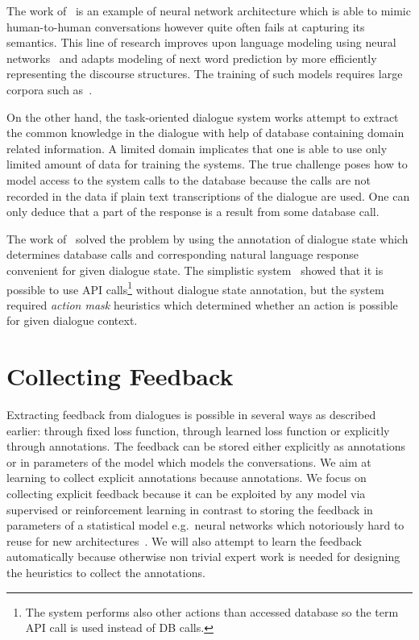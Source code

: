 \documentclass[11pt]{article}
\begin{document}
The work of~\cite{serban_multiresolution_2016} is an example of neural network architecture which is able to mimic human-to-human conversations however quite often fails at capturing its semantics.
This line of research improves upon language modeling using neural networks~\cite{mikolov_efficient_2013} and adapts modeling of next word prediction by more efficiently representing the discourse structures.
The training of such models requires large corpora such as~\cite{lowe_ubuntu_2015}. 

On the other hand, the task-oriented dialogue system works attempt to extract the common knowledge in the dialogue with help of database containing domain related information.
A limited domain implicates that one is able to use only limited amount of data for training the systems.
The true challenge poses how to model access to the system calls to the database because the calls are not recorded in the data if plain text transcriptions of the dialogue are used.
One can only deduce that a part of the response is a result from some database call.

The work of~\cite{wen_networkbased_2016} solved the problem by using the annotation of dialogue state which determines database calls and corresponding natural language response convenient for given dialogue state. 
The simplistic system~\cite{williams2016end} showed that it is possible to use API calls\footnote{The system performs also other actions than accessed database so the term API call is used instead of DB calls.} without dialogue state annotation, but the system required {\it action mask} heuristics which determined whether an action is possible for given dialogue context.

\section{Collecting Feedback}
\label{sec:learn_feedback}
Extracting feedback from dialogues is possible in several ways as described earlier: through fixed loss function, through learned loss function or explicitly through annotations.
The feedback can be stored either explicitly as annotations or in parameters of the model which models the conversations.
We aim at learning to collect explicit annotations because annotations.
We focus on collecting explicit feedback because it can be exploited by any model via supervised or reinforcement learning in contrast to storing the feedback in parameters of a statistical model e.g.\ neural networks which notoriously hard to reuse for new architectures~\cite{oquab_learning_2014}.
We will also attempt to learn the feedback automatically because otherwise non trivial expert work is needed for designing the heuristics to collect the annotations.
\end{document}

